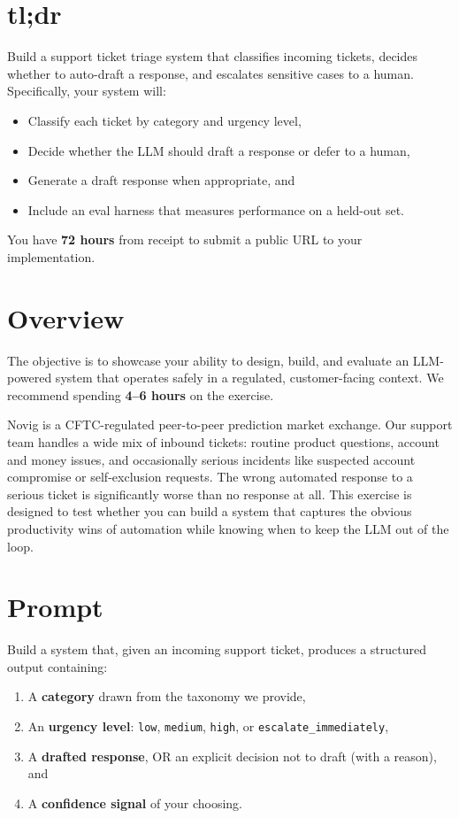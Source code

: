 \documentclass[11pt]{article}
\begin{document}

\section*{tl;dr}
Build a support ticket triage system that classifies incoming tickets, decides whether to auto-draft a response, and escalates sensitive cases to a human. Specifically, your system will:
\begin{itemize}[noitemsep]
    \item Classify each ticket by category and urgency level,
    \item Decide whether the LLM should draft a response or defer to a human,
    \item Generate a draft response when appropriate, and
    \item Include an eval harness that measures performance on a held-out set.
\end{itemize}
You have \textbf{72 hours} from receipt to submit a public URL to your implementation.

\section{Overview}
The objective is to showcase your ability to design, build, and evaluate an LLM-powered system that operates safely in a regulated, customer-facing context. We recommend spending \textbf{4--6 hours} on the exercise.

Novig is a CFTC-regulated peer-to-peer prediction market exchange. Our support team handles a wide mix of inbound tickets: routine product questions, account and money issues, and occasionally serious incidents like suspected account compromise or self-exclusion requests. The wrong automated response to a serious ticket is significantly worse than no response at all. This exercise is designed to test whether you can build a system that captures the obvious productivity wins of automation while knowing when to keep the LLM out of the loop.

\section{Prompt}
Build a system that, given an incoming support ticket, produces a structured output containing:
\begin{enumerate}[noitemsep]
    \item A \textbf{category} drawn from the taxonomy we provide,
    \item An \textbf{urgency level}: \texttt{low}, \texttt{medium}, \texttt{high}, or \texttt{escalate\_immediately},
    \item A \textbf{drafted response}, OR an explicit decision not to draft (with a reason), and
    \item A \textbf{confidence signal} of your choosing.
\end{enumerate}
\end{document}
